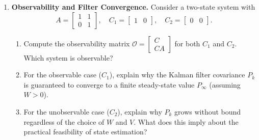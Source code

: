 \begin{enumerate}
\item \textbf{Observability and Filter Convergence.}
Consider a two-state system with
\[
A = \begin{bmatrix} 1 & 1 \\ 0 & 1 \end{bmatrix}, \quad C_1 = \begin{bmatrix} 1 & 0 \end{bmatrix}, \quad C_2 = \begin{bmatrix} 0 & 0 \end{bmatrix}.
\]
\begin{enumerate}
	\item Compute the observability matrix $\mathcal{O} = \begin{bmatrix} C \\ CA \end{bmatrix}$ for both $C_1$ and $C_2$. Which system is observable?
	\item For the observable case ($C_1$), explain why the Kalman filter covariance $P_k$ is guaranteed to converge to a finite steady-state value $P_\infty$ (assuming $W > 0$).
	\item For the unobservable case ($C_2$), explain why $P_k$ grows without bound regardless of the choice of $W$ and $V$.  What does this imply about the practical feasibility of state estimation?
\end{enumerate}

\end{enumerate}

